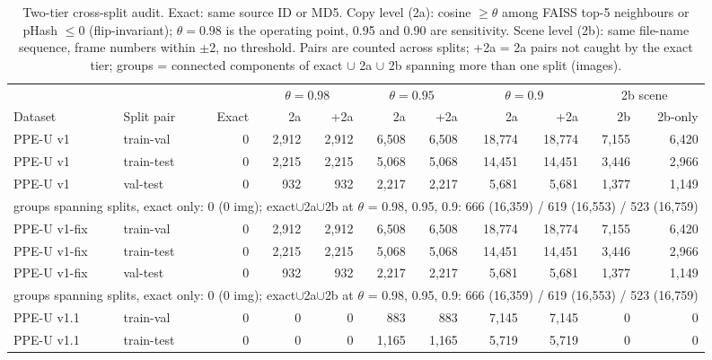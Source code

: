 \begin{table}[t]
\centering\footnotesize
\caption{Two-tier cross-split audit. Exact: same source ID or MD5. Copy level (2a): cosine $\ge\theta$ among FAISS top-5 neighbours or pHash $\le 0$ (flip-invariant); $\theta=0.98$ is the operating point, 0.95 and 0.90 are sensitivity. Scene level (2b): same file-name sequence, frame numbers within $\pm2$, no threshold. Pairs are counted across splits; +2a = 2a pairs not caught by the exact tier; groups = connected components of exact $\cup$ 2a $\cup$ 2b spanning more than one split (images).}
\label{tab:audit_v2}
\begin{tabular}{ll r rr rr rr rr}
\toprule
 & & & \multicolumn{2}{c}{$\theta=0.98$} & \multicolumn{2}{c}{$\theta=0.95$} & \multicolumn{2}{c}{$\theta=0.9$} & \multicolumn{2}{c}{2b scene} \\
\cmidrule(lr){4-5} \cmidrule(lr){6-7} \cmidrule(lr){8-9} \cmidrule(lr){10-11}
Dataset & Split pair & Exact & 2a & +2a & 2a & +2a & 2a & +2a & 2b & 2b-only \\
\midrule
PPE-U v1 & train-val & 0 & 2{,}912 & 2{,}912 & 6{,}508 & 6{,}508 & 18{,}774 & 18{,}774 & 7{,}155 & 6{,}420 \\
PPE-U v1 & train-test & 0 & 2{,}215 & 2{,}215 & 5{,}068 & 5{,}068 & 14{,}451 & 14{,}451 & 3{,}446 & 2{,}966 \\
PPE-U v1 & val-test & 0 & 932 & 932 & 2{,}217 & 2{,}217 & 5{,}681 & 5{,}681 & 1{,}377 & 1{,}149 \\
\multicolumn{11}{r}{\scriptsize groups spanning splits, exact only: 0 (0 img); exact$\cup$2a$\cup$2b at $\theta$ = 0.98, 0.95, 0.9: 666 (16{,}359) / 619 (16{,}553) / 523 (16{,}759)} \\
\midrule
PPE-U v1-fix & train-val & 0 & 2{,}912 & 2{,}912 & 6{,}508 & 6{,}508 & 18{,}774 & 18{,}774 & 7{,}155 & 6{,}420 \\
PPE-U v1-fix & train-test & 0 & 2{,}215 & 2{,}215 & 5{,}068 & 5{,}068 & 14{,}451 & 14{,}451 & 3{,}446 & 2{,}966 \\
PPE-U v1-fix & val-test & 0 & 932 & 932 & 2{,}217 & 2{,}217 & 5{,}681 & 5{,}681 & 1{,}377 & 1{,}149 \\
\multicolumn{11}{r}{\scriptsize groups spanning splits, exact only: 0 (0 img); exact$\cup$2a$\cup$2b at $\theta$ = 0.98, 0.95, 0.9: 666 (16{,}359) / 619 (16{,}553) / 523 (16{,}759)} \\
\midrule
PPE-U v1.1 & train-val & 0 & 0 & 0 & 883 & 883 & 7{,}145 & 7{,}145 & 0 & 0 \\
PPE-U v1.1 & train-test & 0 & 0 & 0 & 1{,}165 & 1{,}165 & 5{,}719 & 5{,}719 & 0 & 0 \\

\end{tabular}
\end{table}
